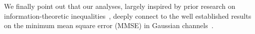 \documentclass[11pt]{article}
\begin{document}
We finally point out that our analyses, largely inspired by prior research on information-theoretic inequalities~\citep{stam1959some, dembo2002information}, deeply connect to the well established results on the minimum mean square error (MMSE) in Gaussian channels~\citep{guo2004mutual, guo2011estimation, ledoux2016heat}.




\end{document}
